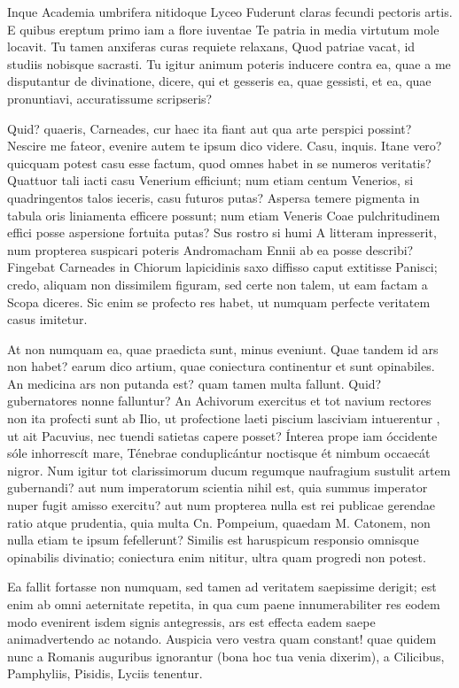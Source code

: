  Inque Academia umbrifera nitidoque Lyceo Fuderunt claras fecundi pectoris artis. E quibus ereptum primo iam a flore iuventae Te patria in media virtutum mole locavit. Tu tamen anxiferas curas requiete relaxans, Quod patriae vacat, id studiis nobisque sacrasti. Tu igitur animum poteris inducere contra ea, quae a me disputantur de divinatione, dicere, qui et gesseris ea, quae gessisti, et ea, quae pronuntiavi, accuratissume scripseris?

 Quid? quaeris, Carneades, cur haec ita fiant aut qua arte perspici possint? Nescire me fateor, evenire autem te ipsum dico videre. Casu, inquis. Itane vero? quicquam potest casu esse factum, quod omnes habet in se numeros veritatis? Quattuor tali iacti casu Venerium efficiunt; num etiam centum Venerios, si quadringentos talos ieceris, casu futuros putas? Aspersa temere pigmenta in tabula oris liniamenta efficere possunt; num etiam Veneris Coae pulchritudinem effici posse aspersione fortuita putas? Sus rostro si humi A litteram inpresserit, num propterea suspicari poteris Andromacham Ennii ab ea posse describi? Fingebat Carneades in Chiorum lapicidinis saxo diffisso caput extitisse Panisci; credo, aliquam non dissimilem figuram, sed certe non talem, ut eam factam a Scopa diceres. Sic enim se profecto res habet, ut numquam perfecte veritatem casus imitetur.

 At non numquam ea, quae praedicta sunt, minus eveniunt. Quae tandem id ars non habet? earum dico artium, quae coniectura continentur et sunt opinabiles. An medicina ars non putanda est? quam tamen multa fallunt. Quid? gubernatores nonne falluntur? An Achivorum exercitus et tot navium rectores non ita profecti sunt ab Ilio, ut profectione laeti piscium lasciviam intuerentur , ut ait Pacuvius, nec tuendi satietas capere posset? Ínterea prope iam óccidente sóle inhorrescít mare, Ténebrae conduplicántur noctisque ét nimbum occaecát nigror. Num igitur tot clarissimorum ducum regumque naufragium sustulit artem gubernandi? aut num imperatorum scientia nihil est, quia summus imperator nuper fugit amisso exercitu? aut num propterea nulla est rei publicae gerendae ratio atque prudentia, quia multa Cn. Pompeium, quaedam M. Catonem, non nulla etiam te ipsum fefellerunt? Similis est haruspicum responsio omnisque opinabilis divinatio; coniectura enim nititur, ultra quam progredi non potest.

 Ea fallit fortasse non numquam, sed tamen ad veritatem saepissime derigit; est enim ab omni aeternitate repetita, in qua cum paene innumerabiliter res eodem modo evenirent isdem signis antegressis, ars est effecta eadem saepe animadvertendo ac notando. Auspicia vero vestra quam constant! quae quidem nunc a Romanis auguribus ignorantur (bona hoc tua venia dixerim), a Cilicibus, Pamphyliis, Pisidis, Lyciis tenentur.

